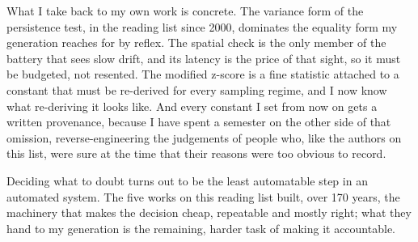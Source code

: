What I take back to my own work is concrete. The variance form of the
persistence test, in the reading list since 2000, dominates the equality
form my generation reaches for by reflex. The spatial check is the only
member of the battery that sees slow drift, and its latency is the price of
that sight, so it must be budgeted, not resented. The modified z-score is a
fine statistic attached to a constant that must be re-derived for every
sampling regime, and I now know what re-deriving it looks like. And every
constant I set from now on gets a written provenance, because I have spent a
semester on the other side of that omission, reverse-engineering the
judgements of people who, like the authors on this list, were sure at the
time that their reasons were too obvious to record.

Deciding what to doubt turns out to be the least automatable step in an
automated system. The five works on this reading list built, over 170
years, the machinery that makes the decision cheap, repeatable and mostly
right; what they hand to my generation is the remaining, harder task of
making it accountable.
